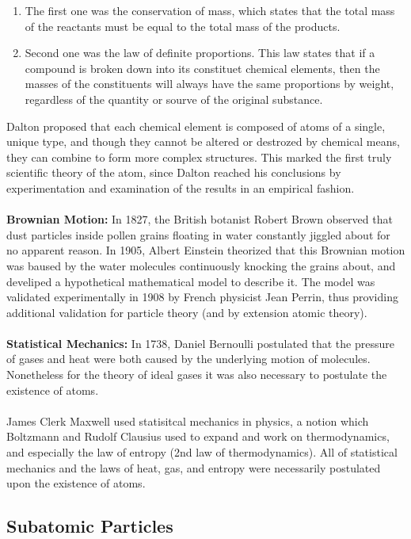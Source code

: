 \documentclass[11pt,a4paper]{article}
\newcounter{theo}
\begin{document}
\begin{enumerate}
    \item The first one was the conservation of mass, which states that the total mass of the reactants must be equal to the total mass of the products.
    \item Second one was the law of definite proportions. This law states that if a compound is broken down into its constituet chemical elements, then the masses of the constituents will always have the same proportions by weight, regardless of the quantity or sourve of the original substance.
\end{enumerate}

Dalton proposed that each chemical element is composed of atoms of a single, unique type, and though they cannot be altered or destrozed by chemical means, they can combine to form more complex structures. This marked the first truly scientific theory of the atom, since Dalton reached his conclusions by experimentation and examination of the results in an empirical fashion.
\\
\\
\textbf{Brownian Motion:} In 1827, the British botanist Robert Brown observed that dust particles inside pollen grains floating in water constantly jiggled about for no apparent reason. In 1905, Albert Einstein theorized that this Brownian motion was baused by the water molecules continuously knocking the grains about, and develiped a hypothetical mathematical model to describe it. The model was validated experimentally in 1908 by French physicist Jean Perrin, thus providing additional validation for particle theory (and by extension atomic theory).
\\
\\
\textbf{Statistical Mechanics:} In 1738, Daniel Bernoulli postulated that the pressure of gases and heat were both caused by the underlying motion of molecules. Nonetheless for the theory of ideal gases it was also necessary to postulate the existence of atoms.
\\
\\
James Clerk Maxwell used statisitcal mechanics in physics, a notion which Boltzmann and Rudolf Clausius used to expand and work on thermodynamics, and especially the law of entropy (2nd law of thermodynamics). All of statistical mechanics and the laws of heat, gas, and entropy were necessarily postulated upon the existence of atoms.
\subsection{Subatomic Particles}
\end{document}
